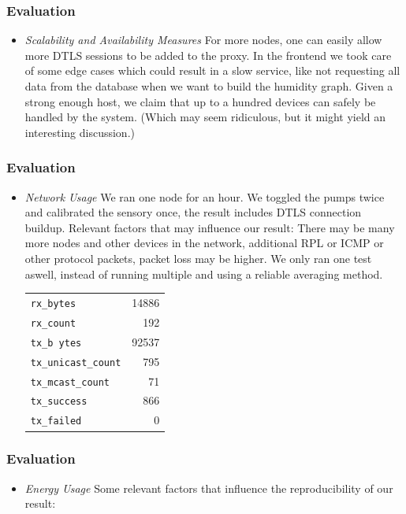 \documentclass[10pt, xcolor=svgnames]{beamer}
\begin{document}
\begin{frame}
    \frametitle{Evaluation}
    \begin{itemize}
        \item \emph{Scalability and Availability Measures} For more nodes, one can easily allow more DTLS sessions to be added to the proxy. In the frontend we took care of some edge cases which could result in a slow service, like not requesting all data from the database when we want to build the humidity graph. Given a strong enough host, we claim that up to a hundred devices can safely be handled by the system. (Which may seem ridiculous, but it might yield an interesting discussion.)
    \end{itemize}
\end{frame}

\begin{frame}
    \frametitle{Evaluation}
    \begin{itemize}
        \item \emph{Network Usage} We ran one node for an hour. We toggled the pumps twice and calibrated the sensory once, the result includes DTLS connection buildup.  Relevant factors that may influence our result: There may be many more nodes and other devices in the network, additional RPL or ICMP or other protocol packets, packet loss may be higher. We only ran one test aswell, instead of running multiple and using a reliable averaging method.
        \begin{table}
            \begin{tabular}{lr}
                \texttt{rx\_bytes}          & 14886\\
                \texttt{rx\_count}          &   192\\
                \texttt{tx\_b ytes}          & 92537\\
                \texttt{tx\_unicast\_count} &   795\\
                \texttt{tx\_mcast\_count}   &    71\\
                \texttt{tx\_success}        &   866\\
                \texttt{tx\_failed}         &     0
            \end{tabular}
        \end{table}
\end{itemize}
\end{frame}

\begin{frame}
    \frametitle{Evaluation}
    \begin{itemize}
        \item \emph{Energy Usage} Some relevant factors that influence the reproducibility of our result:
    \end{itemize}
\end{frame}
\end{document}
